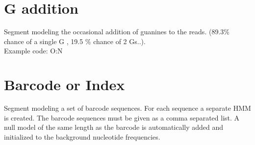 \documentclass[11pt,a4paper,oneside]{book}
\begin{document}
\newpage
\section{G addition}
Segment modeling the occasional addition of guanines to the reads. (89.3\% chance of a single G , 19.5 \% chance of  2 Gs..).\\
Example code: O:N\\


\begin{figure}[H]
\centering
{}
\end{figure}



\section{Barcode or Index}

Segment modeling a set of barcode sequences. For each sequence a separate HMM is created. The barcode sequences must be given as a comma separated list. A null model of the same length as the barcode is automatically added and initialized to the background nucleotide frequencies. \\
\end{document}
